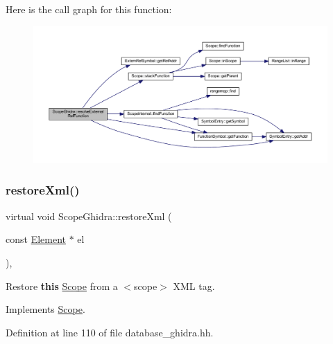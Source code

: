 Here is the call graph for this function\+:
\nopagebreak
\begin{figure}[H]
\begin{center}
\leavevmode
\includegraphics[width=350pt]{class_scope_ghidra_afdb2e6de63033bb78e6c4168c8e25227_cgraph}
\end{center}
\end{figure}
\mbox{\label{class_scope_ghidra_ad6efdd1eb3b3189dc6020a0440128be3}} 
\subsubsection{\texorpdfstring{restoreXml()}{restoreXml()}}
{\footnotesize\ttfamily virtual void Scope\+Ghidra\+::restore\+Xml (\begin{DoxyParamCaption}\item[{const \mbox{\hyperlink{class_element}{Element}} $\ast$}]{el }\end{DoxyParamCaption})\hspace{0.3cm}{\ttfamily [inline]}, {\ttfamily [virtual]}}



Restore {\bfseries{this}} \mbox{\hyperlink{class_scope}{Scope}} from a $<$scope$>$ X\+ML tag. 



Implements \mbox{\hyperlink{class_scope_ad509027899b5f6af11f499f722d61f66}{Scope}}.



Definition at line 110 of file database\+\_\+ghidra.\+hh.

\mbox{\label{class_scope_ghidra_a0de93cdd506ae1490d939b957738f656}} 
